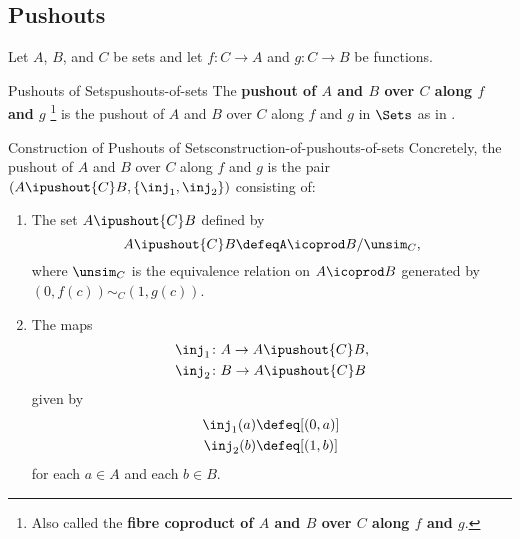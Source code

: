 \subsection{Pushouts}\label{subsection-pushouts-of-sets}
Let $A$, $B$, and $C$ be sets and let $f\colon C\to A$ and $g\colon C\to B$ be functions.
\begin{definition}{Pushouts of Sets}{pushouts-of-sets}%
    The \textbf{pushout of $A$ and $B$ over $C$ along $f$ and $g$}%
    \footnote{%
        Also called the \textbf{fibre coproduct of $A$ and $B$ over $C$ along $f$ and $g$}.
        \par\vspace*{\TCBBoxCorrection}
    } %
    is the pushout of $A$ and $B$ over $C$ along $f$ and $g$ in $\Sets$ as in .
\end{definition}
\begin{construction}{Construction of Pushouts of Sets}{construction-of-pushouts-of-sets}%
    Concretely, the pushout of $A$ and $B$ over $C$ along $f$ and $g$ is the pair $(A\ipushout{C}B,\{\inj_{1},\inj_{2}\})$ consisting of:
    \begin{enumerate}
        \item\label{construction-of-pushouts-of-sets-the-colimit}The set $A\ipushout{C}B$ defined by
            \[
                A\ipushout{C}B%
                \defeq%
                A\icoprod B/\unsim_{C},
            \]%
            where $\unsim_{C}$ is the equivalence relation on $A\icoprod B$ generated by $(0,f(c))\sim_{C}(1,g(c))$.
        \item\label{construction-of-pushouts-of-sets-the-cocone}The maps
            \begin{align*}
                \inj_{1} &\colon A\to A\ipushout{C}B,\\
                \inj_{2} &\colon B\to A\ipushout{C}B
            \end{align*}
            given by
            \begin{align*}
                \inj_{1}(a) &\defeq [(0,a)]\\%
                \inj_{2}(b) &\defeq [(1,b)]%
            \end{align*}
            for each $a\in A$ and each $b\in B$.
    \end{enumerate}
\end{construction}
